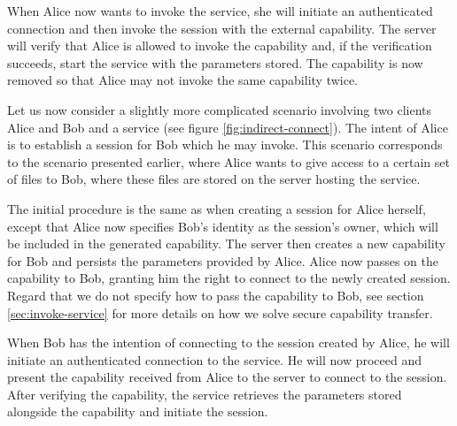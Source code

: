 When Alice now wants to invoke the service, she will initiate an authenticated connection and then invoke the session with the external capability.
The server will verify that Alice is allowed to invoke the capability and, if the verification succeeds, start the service with the parameters stored.
The capability is now removed so that Alice may not invoke the same capability twice.

Let us now consider a slightly more complicated scenario involving two clients Alice and Bob and a service (see figure \ref{fig:indirect-connect}).
The intent of Alice is to establish a session for Bob which he may invoke.
This scenario corresponds to the scenario presented earlier, where Alice wants to give access to a certain set of files to Bob, where these files are stored on the server hosting the service.

The initial procedure is the same as when creating a session for Alice herself, except that Alice now specifies Bob's identity as the session's owner, which will be included in the generated capability.
The server then creates a new capability for Bob and persists the parameters provided by Alice.
Alice now passes on the capability to Bob, granting him the right to connect to the newly created session.
Regard that we do not specify how to pass the capability to Bob, see section \ref{sec:invoke-service} for more details on how we solve secure capability transfer.

When Bob has the intention of connecting to the session created by Alice, he will initiate an authenticated connection to the service.
He will now proceed and present the capability received from Alice to the server to connect to the session.
After verifying the capability, the service retrieves the parameters stored alongside the capability and initiate the session.

